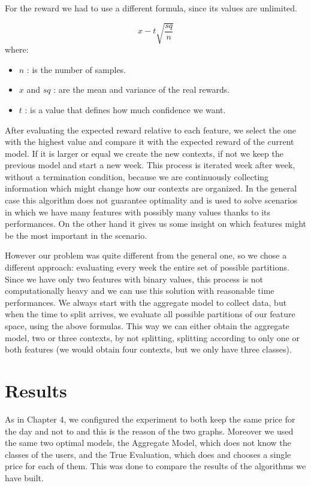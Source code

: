 	For the reward we had to use a different formula, since its values are unlimited.

\begin{equation}
	x - t \sqrt{\frac{sq} {n}}
\end{equation}
where:
\begin{itemize}
	\item $n$ : is the number of samples.
	\item $x$ and $sq$ : are the mean and variance of the real rewards.
	\item $t$ : is a value that defines how much confidence we want.
\end{itemize}

After evaluating the expected reward relative to each feature, we select the one with the highest value and compare it with the expected reward of the current model.
If it is larger or equal we create the new contexts, if not we keep the previous model and start a new week.
This process is iterated week after week, without a termination condition, because we are continuously collecting information which might change how our contexts are organized.
In the general case this algorithm does not guarantee optimality and is used to solve scenarios in which we have many features with possibly many values thanks to its performances.
On the other hand it gives us some insight on which features might be the most important in the scenario.

However our problem was quite different from the general one, so we chose a different approach: evaluating every week the entire set of possible partitions.
Since we have only two features with binary values, this process is not computationally heavy and we can use this solution with reasonable time performances.
We always start with the aggregate model to collect data, but when the time to split arrives, we evaluate all possible partitions of our feature space, using the above formulas.
This way we can either obtain the aggregate model, two or three contexts, by not splitting, splitting according to only one or both features (we would obtain four contexts, but we only have three classes).

\section{Results}\label{sec:our-result}

As in Chapter 4, we configured the experiment to both keep the same price for the day and not to and this is the reason of the two graphs.
Moreover we used the same two optimal models, the Aggregate Model, which does not know the classes of the users, and the True Evaluation, which does and chooses a single price for each of them.
This was done to compare the results of the algorithms we have built.


